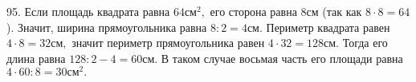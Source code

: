 95. Если площадь квадрата равна $64\text{см}^2,$ его сторона равна $8\text{см}$ (так как $8\cdot8=64$). Значит, ширина прямоугольника равна $8:2=4\text{см}.$ Периметр квадрата равен $4\cdot8=32\text{см},$ значит периметр прямоугольника равен $4\cdot32=128$см. Тогда его длина равна $128:2-4=60$см. В таком случае восьмая
часть его площади равна $4\cdot60:8=30\text{см}^2.$\\
